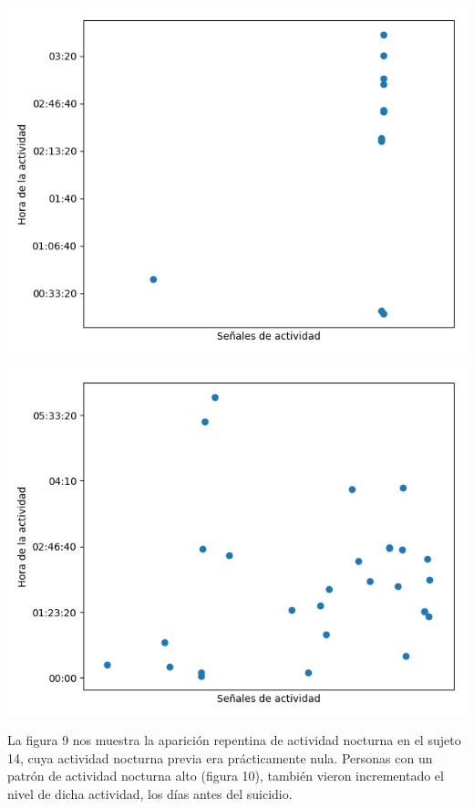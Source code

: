 \documentclass[12pt, man, donotrepeattitle, letterpaper]{apa6}
\begin{document}
    \begin{center}
        \begin{minipage}{0.39\linewidth}
            \includegraphics[width=\linewidth]{images/time_angie}
        \end{minipage}
        \begin{minipage}{0.39\linewidth}
            \includegraphics[width=\linewidth]{images/time_juan}
        \end{minipage}
    \end{center}
    
    La figura 9 nos muestra la aparición repentina de actividad nocturna en el sujeto 14, cuya actividad nocturna previa era prácticamente nula. Personas con un patrón de actividad nocturna alto (figura 10), también vieron incrementado el nivel de dicha actividad, los días antes del suicidio.
    \newpage
\end{document}
